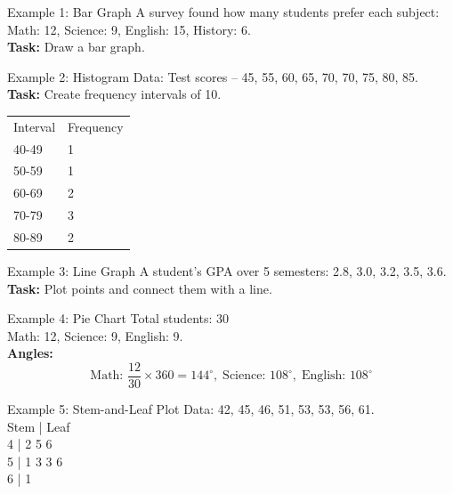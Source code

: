 \documentclass{beamer}
\begin{document}
\begin{frame}{Example 1: Bar Graph}
A survey found how many students prefer each subject:
\\
Math: 12, Science: 9, English: 15, History: 6.
\\
\textbf{Task:} Draw a bar graph.

\begin{center}
\end{center}
\end{frame}

\begin{frame}{Example 2: Histogram}
Data: Test scores -- 45, 55, 60, 65, 70, 70, 75, 80, 85.
\\
\textbf{Task:} Create frequency intervals of 10.

\begin{tabular}{ll}
Interval & Frequency \\
40-49 & 1 \\
50-59 & 1 \\
60-69 & 2 \\
70-79 & 3 \\
80-89 & 2 \\
\end{tabular}
\end{frame}

\begin{frame}{Example 3: Line Graph}
A student’s GPA over 5 semesters: 2.8, 3.0, 3.2, 3.5, 3.6.
\\
\textbf{Task:} Plot points and connect them with a line.
\\
\end{frame}

\begin{frame}{Example 4: Pie Chart}
Total students: 30
\\
Math: 12, Science: 9, English: 9.
\\
\textbf{Angles:}
\[
\text{Math: } \frac{12}{30} \times 360 = 144^\circ, \; \text{Science: } 108^\circ, \; \text{English: } 108^\circ
\]
\end{frame}

\begin{frame}{Example 5: Stem-and-Leaf Plot}
Data: 42, 45, 46, 51, 53, 53, 56, 61.
\\
Stem | Leaf \\
4 | 2 5 6 \\
5 | 1 3 3 6 \\
6 | 1 \\
\end{frame}
\end{document}
